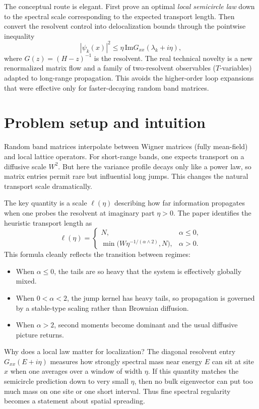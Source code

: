 \documentclass[11pt]{article}
\newcommand{\im}{\mathrm{Im}}
\begin{document}
The conceptual route is elegant. First prove an optimal \emph{local semicircle law} down to the spectral scale corresponding to the expected transport length. Then convert the resolvent control into delocalization bounds through the pointwise inequality
\[
|\psi_k(x)|^2 \le \eta \, \im G_{xx}(\lambda_k+i\eta),
\]
where $G(z)=(H-z)^{-1}$ is the resolvent. The real technical novelty is a new renormalized matrix flow and a family of two-resolvent observables ($T$-variables) adapted to long-range propagation. This avoids the higher-order loop expansions that were effective only for faster-decaying random band matrices.

\section*{Problem setup and intuition}
Random band matrices interpolate between Wigner matrices (fully mean-field) and local lattice operators. For short-range bands, one expects transport on a diffusive scale $W^2$. But here the variance profile decays only like a power law, so matrix entries permit rare but influential long jumps. This changes the natural transport scale dramatically.

The key quantity is a scale $\ell(\eta)$ describing how far information propagates when one probes the resolvent at imaginary part $\eta>0$. The paper identifies the heuristic transport length as
\[
\ell(\eta)=
\begin{cases}
N, & \alpha\le 0,\\
\min\bigl(W\eta^{-1/(\alpha\wedge 2)},N\bigr), & \alpha>0.
\end{cases}
\]
This formula cleanly reflects the transition between regimes:
\begin{itemize}[leftmargin=1.5em]
    \item When $\alpha\le 0$, the tails are so heavy that the system is effectively globally mixed.
    \item When $0<\alpha<2$, the jump kernel has heavy tails, so propagation is governed by a stable-type scaling rather than Brownian diffusion.
    \item When $\alpha>2$, second moments become dominant and the usual diffusive picture returns.
\end{itemize}

Why does a local law matter for localization? The diagonal resolvent entry $G_{xx}(E+i\eta)$ measures how strongly spectral mass near energy $E$ can sit at site $x$ when one averages over a window of width $\eta$. If this quantity matches the semicircle prediction down to very small $\eta$, then no bulk eigenvector can put too much mass on one site or one short interval. Thus fine spectral regularity becomes a statement about spatial spreading.
\end{document}
